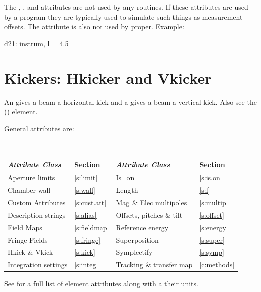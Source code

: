The , , and  attributes are not
used by any \bmad routines. If these attributes are used by a program
they are typically used to simulate such things as measurement
offsets. The  attribute is also not used by \bmad
proper. Example:
\begin{example}
  d21: instrum, l = 4.5
\end{example}

\section{Kickers: Hkicker and Vkicker}
\label{s:hvkicker}

An  gives a beam a horizontal kick and a  gives a 
beam a vertical kick. Also see the  () element.

General   attributes are:
\begin{center}
\tt
\begin{tabular}{llll} \toprule
  {\sl Attribute Class}      & Section           & {\sl Attribute Class}      & Section         \\ \midrule
  Aperture limits            & \ref{s:limit}     & Is_on                      & \ref{s:is.on}   \\
  Chamber wall               & \ref{s:wall}      & Length                     & \ref{s:l}       \\
  Custom Attributes          & \ref{s:cust.att}  & Mag \& Elec multipoles     & \ref{s:multip}  \\
  Description strings        & \ref{s:alias}     & Offsets, pitches \& tilt   & \ref{s:offset}  \\
  Field Maps                 & \ref{s:fieldmap}  & Reference energy           & \ref{s:energy}  \\ 
  Fringe Fields              & \ref{s:fringe}    & Superposition              & \ref{s:super}   \\
  Hkick \& Vkick             & \ref{s:kick}      & Symplectify                & \ref{s:symp}    \\
  Integration settings       & \ref{s:integ}     & Tracking \& transfer map   & \ref{c:methods} \\
  \bottomrule
\end{tabular}
\end{center}
\toffset
See  for a full list of element attributes along with a their units.

